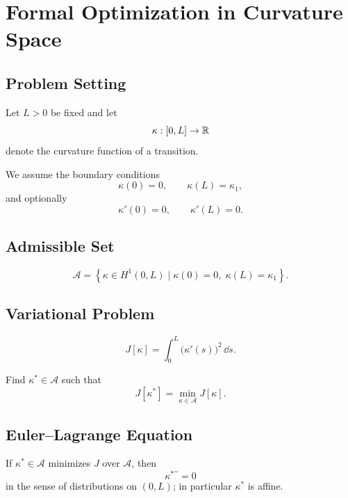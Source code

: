 
\section{Formal Optimization in Curvature Space}

\subsection{Problem Setting}

Let \(L>0\) be fixed and let
\[
\kappa : [0,L] \to \mathbb{R}
\]
denote the curvature function of a transition.

We assume the boundary conditions
\[
\kappa(0)=0,
\qquad
\kappa(L)=\kappa_1,
\]
and optionally
\[
\kappa'(0)=0,
\qquad
\kappa'(L)=0.
\]

\subsection{Admissible Set}

\begin{definition}
\[
\mathcal{A}
=
\left\{
\kappa \in H^1(0,L)
\mid
\kappa(0)=0,\;
\kappa(L)=\kappa_1
\right\}.
\]
\end{definition}

\subsection{Variational Problem}

\begin{definition}
\[
J[\kappa]
=
\int_0^L \bigl(\kappa'(s)\bigr)^2 \, \dd s .
\]
\end{definition}

\begin{definition}
Find $\kappa^\ast \in \mathcal{A}$ such that
\[
J[\kappa^\ast]
=
\min_{\kappa \in \mathcal{A}} J[\kappa].
\]
\end{definition}

\subsection{Euler--Lagrange Equation}

\begin{proposition}
\label{prop:curvature-el}
If \(\kappa^\ast\in\mathcal{A}\) minimizes \(J\) over \(\mathcal{A}\), then
\[
\kappa^{\ast\prime\prime}=0
\]
in the sense of distributions on \((0,L)\); in particular \(\kappa^\ast\)
is affine.
\end{proposition}

